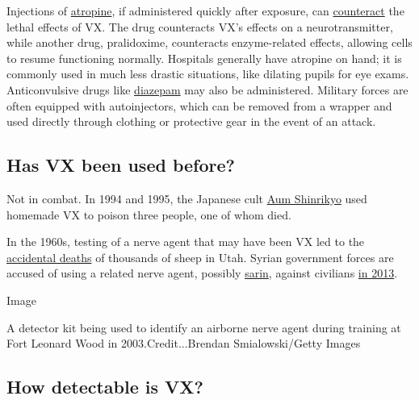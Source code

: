 Injections of
\href{https://pubchem.ncbi.nlm.nih.gov/compound/atropine}{atropine}, if
administered quickly after exposure, can
\href{http://www.popularmechanics.com/science/health/a9388/how-it-works-atropine-the-nerve-gas-antidote-15859092/}{counteract}
the lethal effects of VX. The drug counteracts VX's effects on a
neurotransmitter, while another drug, pralidoxime, counteracts
enzyme-related effects, allowing cells to resume functioning normally.
Hospitals generally have atropine on hand; it is commonly used in much
less drastic situations, like dilating pupils for eye exams.
Anticonvulsive drugs like
\href{https://pubchem.ncbi.nlm.nih.gov/compound/3016\#section=Therapeutic-Uses}{diazepam}
may also be administered. Military forces are often equipped with
autoinjectors, which can be removed from a wrapper and used directly
through clothing or protective gear in the event of an attack.

\hypertarget{has-vx-been-used-before}{%
\subsection{Has VX been used before?}\label{has-vx-been-used-before}}

Not in combat. In 1994 and 1995, the Japanese cult
\href{http://www.japantimes.co.jp/news/2015/03/14/national/history/cult-attraction-aum-shinrikyos-power-persuasion/\#.WK--yW996po}{Aum
Shinrikyo} used homemade VX to poison three people, one of whom died.

In the 1960s, testing of a nerve agent that may have been VX led to the
\href{http://query.nytimes3xbfgragh.onion/gst/abstract.html?res=9F05E7DF1639EF3BBC4A51DFB3668382679EDE\&legacy=true}{accidental
deaths} of thousands of sheep in Utah. Syrian government forces are
accused of using a related nerve agent, possibly
\href{https://emergency.cdc.gov/agent/sarin/}{sarin}, against civilians
\href{http://www.nytimes3xbfgragh.onion/2013/12/29/world/middleeast/new-study-refines-view-of-sarin-attack-in-syria.html}{in
2013}.

Image

A detector kit being used to identify an airborne nerve agent during
training at Fort Leonard Wood in 2003.Credit...Brendan Smialowski/Getty
Images

\hypertarget{how-detectable-is-vx}{%
\subsection{How detectable is VX?}\label{how-detectable-is-vx}}

